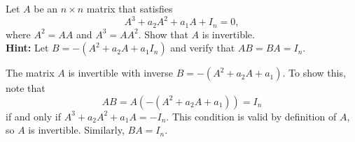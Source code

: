 \documentclass{ximera}
\begin{document}
\begin{exercise} \label{c4.8.5}
Let $A$ be an $n\times n$ matrix that satisfies
\[
A^3 + a_2A^2 + a_1A + I_n = 0,
\]
where $A^2=AA$ and $A^3=AA^2$.  Show that $A$ is invertible. \\
{\bf Hint:}  Let $B = -(A^2+a_2A+a_1I_n)$ and verify that $AB=BA=I_n$.

\begin{solution}

The matrix $A$ is invertible with inverse $B = -(A^2 + a_2A + a_1)$.
To show this, note that
\[ AB = A(-(A^2 + a_2A + a_1)) = I_n \]
if and only if $A^3 + a_2A^2 + a_1A = -I_n$.  This condition is valid
by definition of $A$, so $A$ is invertible.  Similarly, $BA = I_n$.

\end{solution}
\end{exercise}
\end{document}

